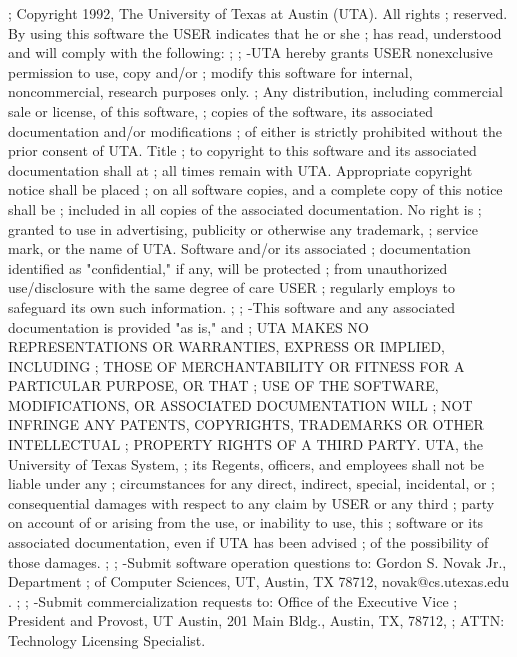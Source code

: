 ; Copyright 1992, The University of Texas at Austin (UTA).  All rights
; reserved.  By using this software the USER indicates that he or she
; has read, understood and will comply with the following:
;
; -UTA hereby grants USER nonexclusive permission to use, copy and/or
; modify this software for internal, noncommercial, research purposes only.
; Any distribution, including commercial sale or license, of this software,
; copies of the software, its associated documentation and/or modifications
; of either is strictly prohibited without the prior consent of UTA.  Title
; to copyright to this software and its associated documentation shall at
; all times remain with UTA.  Appropriate copyright notice shall be placed
; on all software copies, and a complete copy of this notice shall be
; included in all copies of the associated documentation.  No right is
; granted to use in advertising, publicity or otherwise any trademark,
; service mark, or the name of UTA.  Software and/or its associated
; documentation identified as "confidential," if any, will be protected
; from unauthorized use/disclosure with the same degree of care USER
; regularly employs to safeguard its own such information.
;
; -This software and any associated documentation is provided "as is," and
; UTA MAKES NO REPRESENTATIONS OR WARRANTIES, EXPRESS OR IMPLIED, INCLUDING
; THOSE OF MERCHANTABILITY OR FITNESS FOR A PARTICULAR PURPOSE, OR THAT
; USE OF THE SOFTWARE, MODIFICATIONS, OR ASSOCIATED DOCUMENTATION WILL
; NOT INFRINGE ANY PATENTS, COPYRIGHTS, TRADEMARKS OR OTHER INTELLECTUAL
; PROPERTY RIGHTS OF A THIRD PARTY.  UTA, the University of Texas System,
; its Regents, officers, and employees shall not be liable under any
; circumstances for any direct, indirect, special, incidental, or
; consequential damages with respect to any claim by USER or any third
; party on account of or arising from the use, or inability to use, this
; software or its associated documentation, even if UTA has been advised
; of the possibility of those damages.
;
; -Submit software operation questions to: Gordon S. Novak Jr., Department
; of Computer Sciences, UT, Austin, TX 78712, novak@cs.utexas.edu .
;
; -Submit commercialization requests to: Office of the Executive Vice
; President and Provost, UT Austin, 201 Main Bldg., Austin, TX, 78712,
; ATTN: Technology Licensing Specialist.

